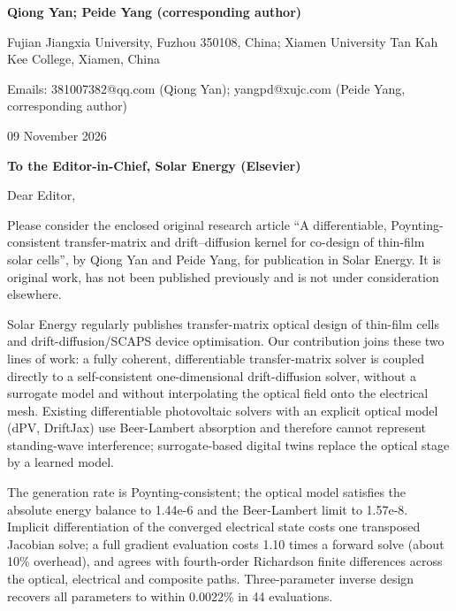 \documentclass[10pt]{article}
\begin{document}
\textbf{Qiong Yan; Peide Yang (corresponding author)}\par
Fujian Jiangxia University, Fuzhou 350108, China; Xiamen University Tan Kah Kee College, Xiamen, China\par
Emails: 381007382@qq.com (Qiong Yan); yangpd@xujc.com (Peide Yang, corresponding author)\par
\vspace{2pt}
09 November 2026\par
\vspace{2pt}
\textbf{To the Editor-in-Chief, Solar Energy (Elsevier)}\par
\vspace{2pt}
Dear Editor,\par
\vspace{2pt}
Please consider the enclosed original research article ``A differentiable, Poynting-consistent transfer-matrix and drift--diffusion kernel for co-design of thin-film solar cells'', by Qiong Yan and Peide Yang, for publication in Solar Energy. It is original work, has not been published previously and is not under consideration elsewhere.\par
\vspace{2pt}
Solar Energy regularly publishes transfer-matrix optical design of thin-film cells and drift-diffusion/SCAPS device optimisation. Our contribution joins these two lines of work: a fully coherent, differentiable transfer-matrix solver is coupled directly to a self-consistent one-dimensional drift-diffusion solver, without a surrogate model and without interpolating the optical field onto the electrical mesh. Existing differentiable photovoltaic solvers with an explicit optical model (dPV, DriftJax) use Beer-Lambert absorption and therefore cannot represent standing-wave interference; surrogate-based digital twins replace the optical stage by a learned model.\par
\vspace{2pt}
The generation rate is Poynting-consistent; the optical model satisfies the absolute energy balance to 1.44e-6 and the Beer-Lambert limit to 1.57e-8. Implicit differentiation of the converged electrical state costs one transposed Jacobian solve; a full gradient evaluation costs 1.10 times a forward solve (about 10\% overhead), and agrees with fourth-order Richardson finite differences across the optical, electrical and composite paths. Three-parameter inverse design recovers all parameters to within 0.0022\% in 44 evaluations.\par
\vspace{2pt}
\end{document}
